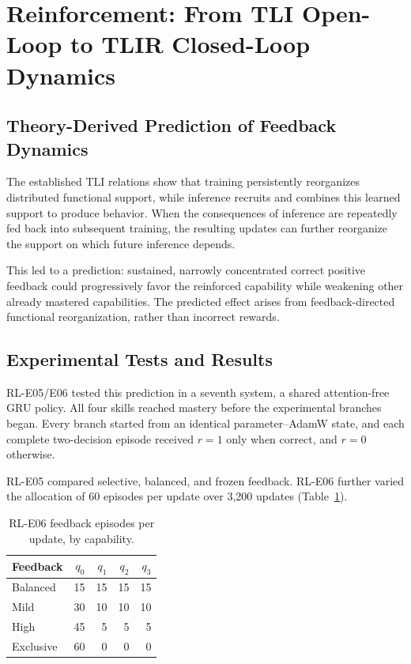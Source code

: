 \documentclass[10pt,twocolumn,letterpaper]{article}
\begin{document}
\section{Reinforcement: From TLI Open-Loop to TLIR Closed-Loop Dynamics}
\label{sec:reinforcement}
\subsection{Theory-Derived Prediction of Feedback Dynamics}
The established TLI relations show that training persistently reorganizes distributed functional support, while inference recruits and combines this learned support to produce behavior. When the consequences of inference are repeatedly fed back into subsequent training, the resulting updates can further reorganize the support on which future inference depends.

This led to a prediction: sustained, narrowly concentrated correct positive feedback could progressively favor the reinforced capability while weakening other already mastered capabilities. The predicted effect arises from feedback-directed functional reorganization, rather than incorrect rewards.

\subsection{Experimental Tests and Results}
RL-E05/E06 tested this prediction in a seventh system, a shared attention-free GRU policy. All four skills reached mastery before the experimental branches began. Every branch started from an identical parameter--AdamW state, and each complete two-decision episode received $r=1$ only when correct, and $r=0$ otherwise.

RL-E05 compared selective, balanced, and frozen feedback. RL-E06 further varied the allocation of 60 episodes per update over 3,200 updates (Table~\ref{tab:dose}).

\begin{table}[t]
\centering\small\setlength{\tabcolsep}{4.1pt}\renewcommand{\arraystretch}{1.08}
\begin{tabular}{@{}lrrrr@{}}\toprule
Feedback & $q_0$ & $q_1$ & $q_2$ & $q_3$\\\midrule
Balanced & 15 & 15 & 15 & 15\\
Mild & 30 & 10 & 10 & 10\\
High & 45 & 5 & 5 & 5\\
Exclusive & 60 & 0 & 0 & 0\\\bottomrule
\end{tabular}
\caption{RL-E06 feedback episodes per update, by capability.}
\label{tab:dose}\end{table}
\end{document}
